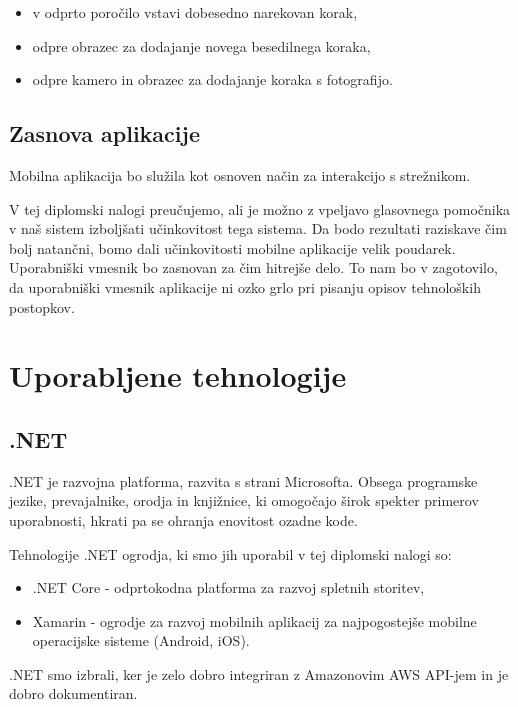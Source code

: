 \documentclass[a4paper, 12pt]{book}
\begin{document}
\begin{itemize}
	\item v odprto poročilo vstavi dobesedno narekovan korak,
	\item odpre obrazec za dodajanje novega besedilnega koraka,
	\item odpre kamero in obrazec za dodajanje koraka s fotografijo.
\end{itemize}


\subsection{Zasnova aplikacije}

Mobilna aplikacija bo služila kot osnoven način za interakcijo s strežnikom.

V tej diplomski nalogi preučujemo, ali je možno z vpeljavo glasovnega pomočnika v naš sistem izboljšati učinkovitost tega sistema.
Da bodo rezultati raziskave čim bolj natančni, bomo dali učinkovitosti mobilne aplikacije velik poudarek.
Uporabniški vmesnik bo zasnovan za čim hitrejše delo.
To nam bo v zagotovilo, da uporabniški vmesnik aplikacije ni ozko grlo pri pisanju opisov tehnoloških postopkov.

\section{Uporabljene tehnologije}

\subsection{.NET}

.NET \cite{dotnet} je razvojna platforma, razvita s strani Microsofta.
Obsega programske jezike, prevajalnike, orodja in knjižnice, ki omogočajo širok spekter primerov uporabnosti, hkrati pa se ohranja enovitost ozadne kode.

Tehnologije .NET ogrodja, ki smo jih uporabil v tej diplomski nalogi so:
\begin{itemize}
	\item .NET Core - odprtokodna platforma za razvoj spletnih storitev,
	\item Xamarin - ogrodje za razvoj mobilnih aplikacij za najpogostejše mobilne operacijske sisteme (Android, iOS).
\end{itemize}

.NET smo izbrali, ker je zelo dobro integriran z Amazonovim AWS API-jem in je dobro dokumentiran.
\end{document}
